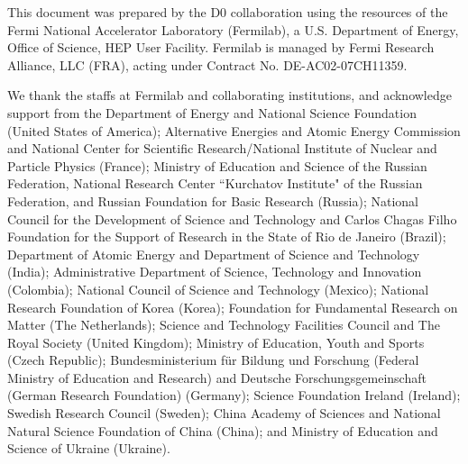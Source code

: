 %

This document was prepared by the D0 collaboration using the resources of the Fermi National Accelerator Laboratory (Fermilab),
a U.S. Department of Energy, Office of Science, HEP User Facility. Fermilab is managed by Fermi Research Alliance, LLC (FRA),
acting under Contract No. DE-AC02-07CH11359.

We thank the staffs at Fermilab and collaborating institutions,
and acknowledge support from the
Department of Energy and National Science Foundation (United States of America);
Alternative Energies and Atomic Energy Commission and
National Center for Scientific Research/National Institute of Nuclear and Particle Physics  (France);
Ministry of Education and Science of the Russian Federation, 
National Research Center ``Kurchatov Institute" of the Russian Federation, and 
Russian Foundation for Basic Research  (Russia);
National Council for the Development of Science and Technology and
Carlos Chagas Filho Foundation for the Support of Research in the State of Rio de Janeiro (Brazil);
Department of Atomic Energy and Department of Science and Technology (India);
Administrative Department of Science, Technology and Innovation (Colombia);
National Council of Science and Technology (Mexico);
National Research Foundation of Korea (Korea);
Foundation for Fundamental Research on Matter (The Netherlands);
Science and Technology Facilities Council and The Royal Society (United Kingdom);
Ministry of Education, Youth and Sports (Czech Republic);
Bundesministerium f\"{u}r Bildung und Forschung (Federal Ministry of Education and Research) and 
Deutsche Forschungsgemeinschaft (German Research Foundation) (Germany);
Science Foundation Ireland (Ireland);
Swedish Research Council (Sweden);
China Academy of Sciences and National Natural Science Foundation of China (China);
and
Ministry of Education and Science of Ukraine (Ukraine).
%
